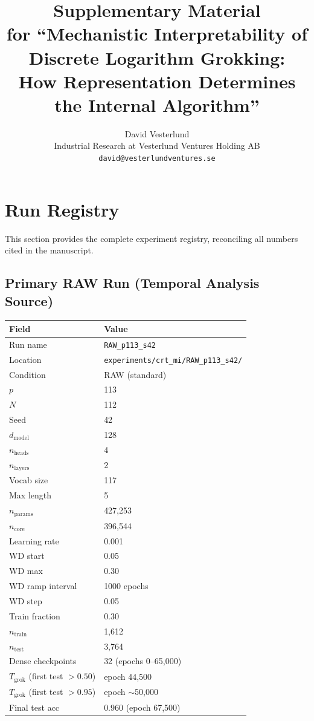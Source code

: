 \documentclass[11pt,a4paper]{article}
\title{Supplementary Material \\
for ``Mechanistic Interpretability of Discrete Logarithm Grokking: \\
How Representation Determines the Internal Algorithm''}
\author{David Vesterlund \\
Industrial Research at Vesterlund Ventures Holding AB \\
\texttt{david@vesterlundventures.se}}
\date{}
\begin{document}
\maketitle

\tableofcontents
\newpage

\section{Run Registry}

This section provides the complete experiment registry, reconciling all numbers cited in the manuscript.

\subsection{Primary RAW Run (Temporal Analysis Source)}

\begin{table}[h]
\centering
\begin{tabular}{ll}
\toprule
Field & Value \\
\midrule
Run name & \texttt{RAW\_p113\_s42} \\
Location & \texttt{experiments/crt\_mi/RAW\_p113\_s42/} \\
Condition & RAW (standard) \\
$p$ & 113 \\
$N$ & 112 \\
Seed & 42 \\
$d_{\mathrm{model}}$ & 128 \\
$n_{\mathrm{heads}}$ & 4 \\
$n_{\mathrm{layers}}$ & 2 \\
Vocab size & 117 \\
Max length & 5 \\
$n_{\mathrm{params}}$ & 427,253 \\
$n_{\mathrm{core}}$ & 396,544 \\
Learning rate & 0.001 \\
WD start & 0.05 \\
WD max & 0.30 \\
WD ramp interval & 1000 epochs \\
WD step & 0.05 \\
Train fraction & 0.30 \\
$n_{\mathrm{train}}$ & 1,612 \\
$n_{\mathrm{test}}$ & 3,764 \\
Dense checkpoints & 32 (epochs 0--65,000) \\
$T_{\mathrm{grok}}$ (first test $> 0.50$) & epoch 44,500 \\
$T_{\mathrm{grok}}$ (first test $> 0.95$) & epoch $\sim$50,000 \\
Final test acc & 0.960 (epoch 67,500) \\
\bottomrule
\end{tabular}
\end{table}
\end{document}
